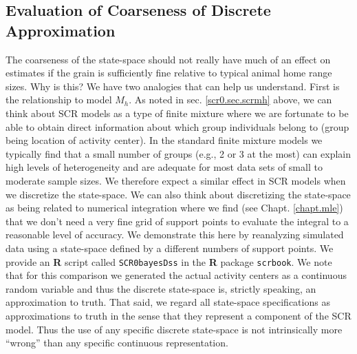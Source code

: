 \subsection{Evaluation of Coarseness of Discrete Approximation}

The coarseness of the state-space should not really have much of an
effect on estimates if the grain is sufficiently fine relative to
typical animal home range sizes.  Why is this?  We have two analogies
that can help us understand. First is the relationship to model
$M_{h}$.  As noted in sec. \ref{scr0.sec.scrmh} above, we can think
about SCR models as a type of finite mixture
\citep{norris_pollock:1996, pledger:2000} where we are fortunate to be
able to obtain direct information about which group individuals belong
to (group being location of activity center).  In the standard finite
mixture models we typically find that a small number of groups (e.g.,
2 or 3 at the most) can explain  high levels of heterogeneity
and are adequate for most data sets of small to moderate sample
sizes. We therefore expect a similar effect in SCR models when we
discretize the state-space.  We can also think about discretizing the
state-space as being related to numerical integration where we find
(see Chapt. \ref{chapt.mle}) that we don't need a very fine grid of
support points to evaluate the integral to a reasonable level of
accuracy. We demonstrate this here by reanalyzing simulated data using
a state-space defined by a different numbers of support points.  We
provide an {\bf R} script called \mbox{\tt SCR0bayesDss} in the
{\bf R} package \mbox{\tt scrbook}.  We note that for this comparison
we generated the actual activity centers as a continuous random
variable and thus the discrete state-space is, strictly speaking, an
approximation to truth. That said, we regard all state-space
specifications as approximations to truth in the sense that they
represent a component of the SCR model.  Thus the use of any specific
discrete state-space is not intrinsically more ``wrong'' than any
specific continuous representation.

